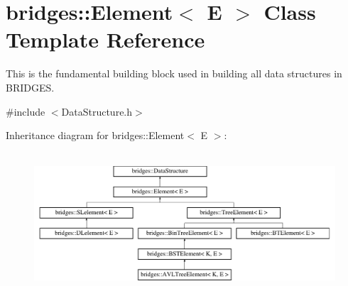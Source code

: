 \hypertarget{classbridges_1_1_element}{}\section{bridges\+:\+:Element$<$ E $>$ Class Template Reference}
\label{classbridges_1_1_element}


This is the fundamental building block used in building all data structures in B\+R\+I\+D\+G\+E\+S.  




{\ttfamily \#include $<$Data\+Structure.\+h$>$}

Inheritance diagram for bridges\+:\+:Element$<$ E $>$\+:\begin{figure}[H]
\begin{center}
\leavevmode
\includegraphics[height=5.283019cm]{classbridges_1_1_element}
\end{center}
\end{figure}
